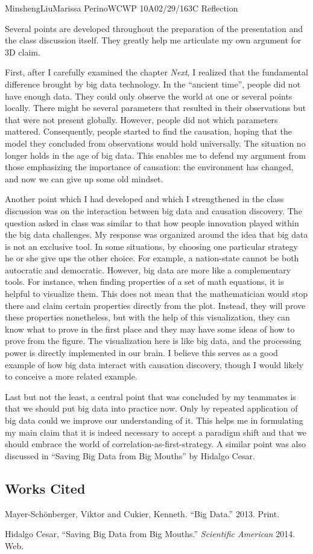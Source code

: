 \documentclass[12pt,letterpaper]{article}
\begin{document}
\begin{mla}{Minsheng}{Liu}{Marissa Perino}{WCWP 10A}{02/29/16}{3C Reflection}

Several points are developed throughout the preparation of the
presentation and the class discussion itself. They greatly help me
articulate my own argument for 3D claim.

First, after I carefully examined the chapter \emph{Next}, I realized
that the fundamental difference brought by big data technology. In the
``ancient time'', people did not have enough data. They could only
observe the world at one or several points locally. There might be
several parameters that resulted in their observations but that were not
present globally. However, people did not which parameters mattered.
Consequently, people started to find the causation, hoping that the
model they concluded from observations would hold universally. The
situation no longer holds in the age of big data. This enables me to
defend my argument from those emphasizing the importance of causation:
the environment has changed, and now we can give up some old mindset.

Another point which I had developed and which I strengthened in the
class discussion was on the interaction between big data and causation
discovery. The question asked in class was similar to that how people
innovation played within the big data challenges. My response was
organized around the idea that big data is not an exclusive tool. In
some situations, by choosing one particular strategy he or she give ups
the other choice. For example, a nation-state cannot be both autocratic
and democratic. However, big data are more like a complementary tools.
For instance, when finding properties of a set of math equations, it is
helpful to visualize them. This does not mean that the mathematician
would stop there and claim certain properties directly from the plot.
Instead, they will prove these properties nonetheless, but with the help
of this visualization, they can know what to prove in the first place
and they may have some ideas of how to prove from the figure. The
visualization here is like big data, and the processing power is
directly implemented in our brain. I believe this serves as a good
example of how big data interact with causation discovery, though I
would likely to conceive a more related example.

Last but not the least, a central point that was concluded by my
teammates is that we should put big data into practice now. Only by
repeated application of big data could we improve our understanding of
it. This helps me in formulating my main claim that it is indeed
necessary to accept a paradigm shift and that we should embrace the
world of correlation-as-first-strategy. A similar point was also
discussed in ``Saving Big Data from Big Mouths'' by Hidalgo Cesar.

\subsection*{Works Cited}
\bibent Mayer-Schönberger, Viktor and Cukier, Kenneth. ``Big Data.'' 2013. Print.

\bibent Hidalgo Cesar, ``Saving Big Data from Big Mouths.'' \textit{Scientific American} 2014. Web.

\end{mla}
\end{document}
